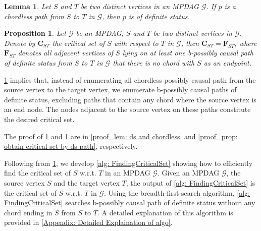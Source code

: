 \documentclass{article}
\newtheorem{proposition}[theorem]{Proposition}
\newtheorem{lemma}[theorem]{Lemma}
\begin{document}

\begin{lemma}\label{lem: ds and chordless}
    Let $S$ and $T$ be two distinct vertices in an MPDAG $\mathcal{G}$. If $p$ is a chordless path from $S$ to $T$ in $\mathcal{G}$, then $p$ is of definite status.
\end{lemma}


\begin{proposition}\label{prop: obtain critical set by ds path}
    Let $\mathcal{G}$ be an MPDAG, $S$ and $T$ be two distinct vertices in $\mathcal{G}$. Denote by $\mathbf{C}_{ST}$ the critical set of $S$ with respect to $T$ in $\mathcal{G}$, then $\mathbf{C}_{ST}=\mathbf{F}_{ST}$, where $\mathbf{F}_{ST}$ denotes all adjacent vertices of $S$ lying on at least one b-possibly causal path of definite status from $S$ to $T$ in $\mathcal{G}$ that there is no chord with $S$ as an endpoint.
\end{proposition}
\cref{prop: obtain critical set by ds path} implies that, instead of enumerating all chordless possibly causal path from the source vertex to the target vertex, we enumerate b-possibly causal paths of definite status, excluding paths that contain any chord where the source vertex is an end node. The nodes adjacent to the source vertex on these paths constitute the desired critical set.

The proof of \cref{lem: ds and chordless} and \cref{prop: obtain critical set by ds path} are in \cref{proof_lem: ds and chordless} and \cref{proof_prop: obtain critical set by ds path}, respectively.

Following from \cref{prop: obtain critical set by ds path}, we develop \cref{alg: FindingCriticalSet} showing how to efficiently find the critical set of $S$ w.r.t. $T$ in an MPDAG $\mathcal{G}$. 
Given an MPDAG $\mathcal{G}$, the source vertex $S$ and the target vertex $T$, the output of \cref{alg: FindingCriticalSet} is the critical set of $S$ w.r.t. $T$ in $\mathcal{G}$. Using the breadth-first-search algorithm, \cref{alg: FindingCriticalSet} searches b-possibly causal path of definite status without any chord ending in $S$ from $S$ to $T$. A detailed explanation of this algorithm is provided in \cref{Appendix: Detailed Explaination of algo}. 
\end{document}
